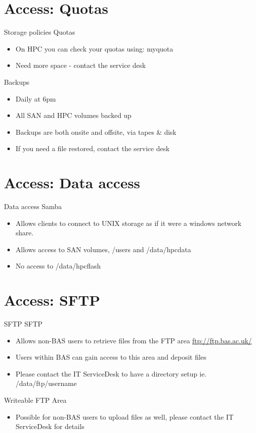 {
\section{Access: Quotas}
%
\begin{frame}{Storage policies}
\text Quotas
\begin{itemize}
\item On HPC you can check your quotas using: myquota
\item Need more space - contact the service desk
\end{itemize}
\text Backups
\begin{itemize}
\item Daily at 6pm
\item All SAN and HPC volumes backed up
\item Backups are both onsite and offsite, via tapes & disk
\item If you need a file restored, contact the service desk
\end{itemize}
\end{frame}
}

{
\section{Access: Data access}
%
\begin{frame}{Data access}
\text Samba
\begin{itemize}
\item Allows clients to connect to UNIX storage as if it were a windows network share.
\item Allows access to SAN volumes, /users and /data/hpcdata
\item No access to /data/hpcflash
\end{itemize}
\end{frame}
}

{
\section{Access: SFTP}
%
\begin{frame}{SFTP}
\text SFTP
\begin{itemize}
\item Allows non-BAS users to retrieve files from the FTP area \href{ftp://ftp.bas.ac.uk/}{ftp://ftp.bas.ac.uk/}
\item  Users within BAS can gain access to this area and deposit files
\item Please contact the IT ServiceDesk to have a directory setup ie. /data/ftp/username
\end{itemize}
\text Writeable FTP Area
\begin{itemize}
\item Possible for non-BAS users to upload files as well, please contact the IT ServiceDesk for details
\end{itemize}
\end{frame}
}

